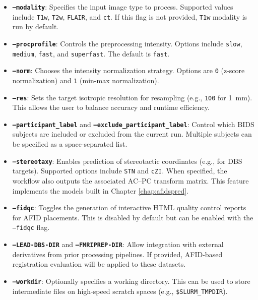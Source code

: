\begin{itemize}
  \item \textbf{\texttt{--modality}}: Specifies the input image type to process. Supported values include \texttt{T1w}, \texttt{T2w}, \texttt{FLAIR}, and \texttt{ct}. If this flag is not provided, \texttt{T1w} modality is run by default.
  
  \item \textbf{\texttt{--procprofile}}: Controls the preprocessing intensity. Options include \texttt{slow}, \texttt{medium}, \texttt{fast}, and \texttt{superfast}. The default is \texttt{fast}.
  
  \item \textbf{\texttt{--norm}}: Chooses the intensity normalization strategy. Options are \texttt{0} (z-score normalization) and \texttt{1} (min-max normalization).
  
  \item \textbf{\texttt{--res}}: Sets the target isotropic resolution for resampling (e.g., \texttt{100} for 1~mm). This allows the user to balance accuracy and runtime efficiency.
  
  \item \textbf{\texttt{--participant\_label}} and \textbf{\texttt{--exclude\_participant\_label}}: Control which BIDS subjects are included or excluded from the current run. Multiple subjects can be specified as a space-separated list.
  
  \item \textbf{\texttt{--stereotaxy}}: Enables prediction of stereotactic coordinates (e.g., for DBS targets). Supported options include \texttt{STN} and \texttt{cZI}. When specified, the workflow also outputs the associated AC–PC transform matrix. This feature implements the models built in Chapter \ref{chap:afidspred}.
  
  \item \textbf{\texttt{--fidqc}}: Toggles the generation of interactive HTML quality control reports for AFID placements. This is disabled by default but can be enabled with the \texttt{--fidqc} flag.
  
  \item \textbf{\texttt{--LEAD-DBS-DIR}} and \textbf{\texttt{--FMRIPREP-DIR}}: Allow integration with external derivatives from prior processing pipelines. If provided, AFID-based registration evaluation will be applied to these datasets.
  
  \item \textbf{\texttt{--workdir}}: Optionally specifies a working directory. This can be used to store intermediate files on high-speed scratch spaces (e.g., \texttt{\$SLURM\_TMPDIR}).
\end{itemize}

